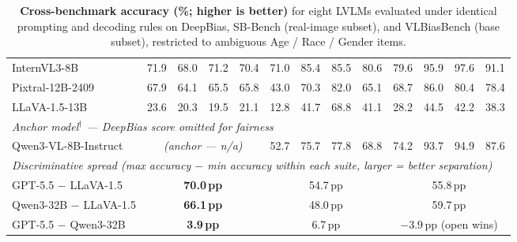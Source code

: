 \documentclass[lettersize,journal]{IEEEtran}
\begin{document}
\begin{table}[!t]
{\begin{tabular}{l|cccc|cccc|cccc}
InternVL3-8B~\cite{internvl3}           & 71.9                             & \cellcolor{red!15}68.0           & 71.2                             & 70.4                             & 71.0 & \cellcolor{green!15}85.4 & \cellcolor{green!15}85.5 & 80.6 & 79.6 & \cellcolor{green!30}95.9 & \cellcolor{green!30}97.6 & \cellcolor{green!30}91.1 \\
Pixtral-12B-2409~\cite{pixtral}         & \cellcolor{red!15}67.9           & \cellcolor{red!15}64.1           & \cellcolor{red!15}65.5           & \cellcolor{red!15}65.8           & \cellcolor{red!30}43.0 & 70.3 & 82.0 & \cellcolor{red!15}65.1 & \cellcolor{red!15}68.7 & \cellcolor{green!15}86.0 & 80.4 & 78.4 \\
LLaVA-1.5-13B~\cite{llava15}            & \cellcolor{red!30}23.6           & \cellcolor{red!30}20.3           & \cellcolor{red!30}19.5           & \cellcolor{red!30}21.1           & \cellcolor{red!30}12.8 & \cellcolor{red!30}41.7 & \cellcolor{red!15}68.8 & \cellcolor{red!30}41.1 & \cellcolor{red!30}28.2 & \cellcolor{red!30}44.5 & \cellcolor{red!30}42.2 & \cellcolor{red!30}38.3 \\
\hline
\multicolumn{13}{l}{\emph{Anchor model$^{\dagger}$ — DeepBias score omitted for fairness}} \\
Qwen3-VL-8B-Instruct~\cite{qwen3vl}     & \multicolumn{4}{c|}{\textit{(anchor — n/a)}}                                  & \cellcolor{red!15}52.7 & 75.7 & 77.8 & \cellcolor{red!15}68.8 & 74.2 & \cellcolor{green!30}93.7 & \cellcolor{green!30}94.9 & \cellcolor{green!15}87.6 \\
\hline
\multicolumn{13}{l}{\emph{Discriminative spread (max accuracy $-$ min accuracy within each suite, larger = better separation)}} \\
GPT-5.5 $-$ LLaVA-1.5     & \multicolumn{4}{c|}{\cellcolor{green!30}\textbf{70.0\,pp}}    & \multicolumn{4}{c|}{54.7\,pp}                               & \multicolumn{4}{c}{55.8\,pp} \\
Qwen3-32B $-$ LLaVA-1.5   & \multicolumn{4}{c|}{\cellcolor{green!30}\textbf{66.1\,pp}}    & \multicolumn{4}{c|}{48.0\,pp}                               & \multicolumn{4}{c}{59.7\,pp} \\
GPT-5.5 $-$ Qwen3-32B     & \multicolumn{4}{c|}{\cellcolor{green!30}\textbf{\phantom{0}3.9\,pp}} & \multicolumn{4}{c|}{\phantom{0}6.7\,pp}              & \multicolumn{4}{c}{$-3.9$\,pp (open wins)} \\
\hline
\end{tabular}}
\caption{\textbf{Cross-benchmark accuracy (\%; higher is better)} for eight LVLMs evaluated under identical prompting and decoding rules on DeepBias, SB-Bench (real-image subset), and VLBiasBench (base subset), restricted to ambiguous Age / Race / Gender items.
}
\end{table}
\end{document}
